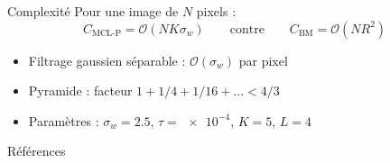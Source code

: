 \documentclass[aspectratio=169, 11pt]{beamer}
\begin{document}
\begin{frame}{Complexité}
  Pour une image de $N$ pixels :
  \[
    C_{\text{MCL-P}} = \mathcal{O}(N K \sigma_w)
    \qquad\text{contre}\qquad
    C_{\text{BM}} = \mathcal{O}(N R^2)
  \]
  \begin{itemize}
    \item Filtrage gaussien séparable : $\mathcal{O}(\sigma_w)$ par pixel
    \item Pyramide : facteur $1 + 1/4 + 1/16 + \dots < 4/3$
    \item Paramètres : $\sigma_w = \num{2.5}$, $\tau = \num{e-4}$, $K = 5$,
          $L = 4$
  \end{itemize}
\end{frame}

\begin{frame}[allowframebreaks]{Références}
  \footnotesize
  \printbibliography[heading=none]
\end{frame}
\end{document}
